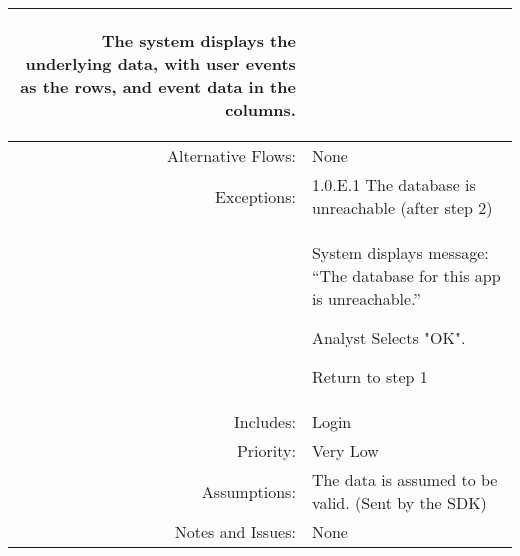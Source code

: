 \documentclass[12pt,oneside,letterpaper]{article}
\newenvironment{packed_enumerate}{ %
\vspace{-7mm}
\begin{enumerate}
  \setlength{\itemsep}{0pt}
  \setlength{\parskip}{0pt}
  \setlength{\parsep}{0pt}
}{\end{enumerate}
\vspace{-8mm}}
\begin{document}
\begin{longtable}{|r|p{3.8in}|}
\begin{packed_enumerate}
\item The system displays the underlying data, with user events as the rows, and event data in the columns.
\end{packed_enumerate}\\
\hline
Alternative Flows:&None\\
\hline
Exceptions:&1.0.E.1 The database is unreachable (after step 2)\\
&  %
\begin{packed_enumerate}
\item System displays message: “The database for this app is unreachable.”
\item Analyst Selects "OK".
\item Return to step 1
\end{packed_enumerate}\\
\hline
Includes:&Login\\
\hline
Priority:&Very Low\\
\hline
Assumptions:&The data is assumed to be valid. (Sent by the SDK) \\
\hline
Notes and Issues:&None\\
\hline

\end{longtable}



\clearpage
\end{document}
